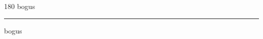 
\begin{frame}
\begin{center}
\begin{turn}{180}
{\fontsize{2.5cm}{1em}\selectfont bogus}
\end{turn}
\vspace{1em}\par  
\hrule
\vspace{1em}\par  
{\fontsize{2.5cm}{1em}\selectfont bogus}
\end{center}
\end{frame}
